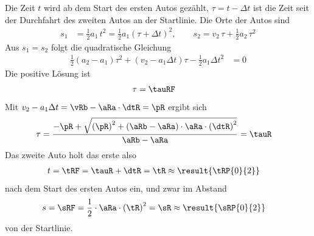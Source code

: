 Die Zeit $t$ wird ab dem Start des ersten Autos gezählt, $\tau = t-\Delta t$ ist die Zeit seit der Durchfahrt des zweiten Autos an der Startlinie. Die Orte der Autos sind
\begin{align}
 s_1 &= \frac{1}{2}a_1\,t^2 = \frac{1}{2}a_1\left(\tau+\Delta t\right)^2, \qquad s_2 = v_2\,\tau+\frac{1}{2}a_2\,\tau^2
\end{align}
Aus $s_1 = s_2$ folgt die quadratische Gleichung
\begin{align}
 \frac{1}{2}\left(a_2-a_1\right)\tau^2+\left(v_2-a_1\Delta t\right)\tau-\frac{1}{2}a_1\Delta t^2 &= 0
\end{align}
Die positive Lösung ist
\begin{align}
 \tau &= \tauRF
\end{align}
Mit $v_2-a_1\Delta t = \vRb-\aRa\cdot\dtR = \pR$ ergibt sich
\begin{align}
 \tau &= \frac{-\pR+\sqrt{\left(\pR\right)^2+\left(\aRb-\aRa\right)\cdot\aRa\cdot\left(\dtR\right)^2}}{\aRb-\aRa} = \tauR
\end{align}
Das zweite Auto holt das erste also
\begin{align}
 t &= \tRF = \tauR+\dtR = \tR \approx \result{\tRP{0}{2}}
\end{align}
nach dem Start des ersten Autos ein, und zwar im Abstand
\begin{align}
 s &= \sRF = \frac{1}{2}\cdot\aRa\cdot\left(\tR\right)^2 = \sR \approx \result{\sRP{0}{2}}
\end{align}
von der Startlinie.

\begin{center}
\end{center}
